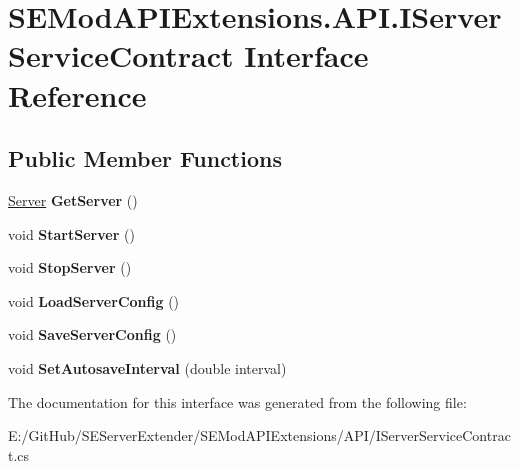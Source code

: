 \hypertarget{interface_s_e_mod_a_p_i_extensions_1_1_a_p_i_1_1_i_server_service_contract}{}\section{S\+E\+Mod\+A\+P\+I\+Extensions.\+A\+P\+I.\+I\+Server\+Service\+Contract Interface Reference}
\label{interface_s_e_mod_a_p_i_extensions_1_1_a_p_i_1_1_i_server_service_contract}
\subsection*{Public Member Functions}
\begin{DoxyCompactItemize}
\item 
\hypertarget{interface_s_e_mod_a_p_i_extensions_1_1_a_p_i_1_1_i_server_service_contract_aca64f1dd918f238dc187b0248fe474aa}{}\hyperlink{class_s_e_mod_a_p_i_extensions_1_1_a_p_i_1_1_server}{Server} {\bfseries Get\+Server} ()\label{interface_s_e_mod_a_p_i_extensions_1_1_a_p_i_1_1_i_server_service_contract_aca64f1dd918f238dc187b0248fe474aa}

\item 
\hypertarget{interface_s_e_mod_a_p_i_extensions_1_1_a_p_i_1_1_i_server_service_contract_a445c42b36f08e1184fc1b0966097aba6}{}void {\bfseries Start\+Server} ()\label{interface_s_e_mod_a_p_i_extensions_1_1_a_p_i_1_1_i_server_service_contract_a445c42b36f08e1184fc1b0966097aba6}

\item 
\hypertarget{interface_s_e_mod_a_p_i_extensions_1_1_a_p_i_1_1_i_server_service_contract_ab244055c4ac3d82311f4465279406ce2}{}void {\bfseries Stop\+Server} ()\label{interface_s_e_mod_a_p_i_extensions_1_1_a_p_i_1_1_i_server_service_contract_ab244055c4ac3d82311f4465279406ce2}

\item 
\hypertarget{interface_s_e_mod_a_p_i_extensions_1_1_a_p_i_1_1_i_server_service_contract_a2107cf4f7e404be25ead5f157742643d}{}void {\bfseries Load\+Server\+Config} ()\label{interface_s_e_mod_a_p_i_extensions_1_1_a_p_i_1_1_i_server_service_contract_a2107cf4f7e404be25ead5f157742643d}

\item 
\hypertarget{interface_s_e_mod_a_p_i_extensions_1_1_a_p_i_1_1_i_server_service_contract_abbca9f6430fe0b38cbb6730b4ca32458}{}void {\bfseries Save\+Server\+Config} ()\label{interface_s_e_mod_a_p_i_extensions_1_1_a_p_i_1_1_i_server_service_contract_abbca9f6430fe0b38cbb6730b4ca32458}

\item 
\hypertarget{interface_s_e_mod_a_p_i_extensions_1_1_a_p_i_1_1_i_server_service_contract_a78e3de8629896c26ec8ed417a218de0b}{}void {\bfseries Set\+Autosave\+Interval} (double interval)\label{interface_s_e_mod_a_p_i_extensions_1_1_a_p_i_1_1_i_server_service_contract_a78e3de8629896c26ec8ed417a218de0b}

\end{DoxyCompactItemize}


The documentation for this interface was generated from the following file\+:\begin{DoxyCompactItemize}
\item 
E\+:/\+Git\+Hub/\+S\+E\+Server\+Extender/\+S\+E\+Mod\+A\+P\+I\+Extensions/\+A\+P\+I/I\+Server\+Service\+Contract.\+cs\end{DoxyCompactItemize}
